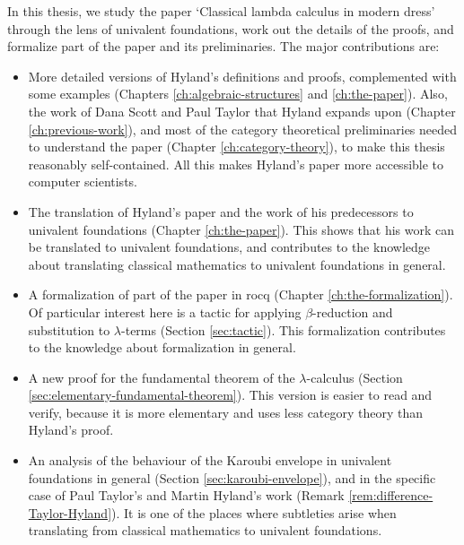 In this thesis, we study the paper `Classical lambda calculus in modern dress' through the lens of univalent foundations, work out the details of the proofs, and formalize part of the paper and its preliminaries. The major contributions are:
\begin{itemize}
  \item More detailed versions of Hyland's definitions and proofs, complemented with some examples (Chapters \ref{ch:algebraic-structures} and \ref{ch:the-paper}). Also, the work of Dana Scott and Paul Taylor that Hyland expands upon (Chapter \ref{ch:previous-work}), and most of the category theoretical preliminaries needed to understand the paper (Chapter \ref{ch:category-theory}), to make this thesis reasonably self-contained. All this makes Hyland's paper more accessible to computer scientists.
  \item The translation of Hyland's paper and the work of his predecessors to univalent foundations (Chapter \ref{ch:the-paper}). This shows that his work can be translated to univalent foundations, and contributes to the knowledge about translating classical mathematics to univalent foundations in general.
  \item A formalization of part of the paper in rocq (Chapter \ref{ch:the-formalization}). Of particular interest here is a tactic for applying $ \beta $-reduction and substitution to $ \lambda $-terms (Section \ref{sec:tactic}). This formalization contributes to the knowledge about formalization in general.
  \item A new proof for the fundamental theorem of the $ \lambda $-calculus (Section \ref{sec:elementary-fundamental-theorem}). This version is easier to read and verify, because it is more elementary and uses less category theory than Hyland's proof.
  \item An analysis of the behaviour of the Karoubi envelope in univalent foundations in general (Section \ref{sec:karoubi-envelope}), and in the specific case of Paul Taylor's and Martin Hyland's work (Remark \ref{rem:difference-Taylor-Hyland}). It is one of the places where subtleties arise when translating from classical mathematics to univalent foundations.
\end{itemize}

